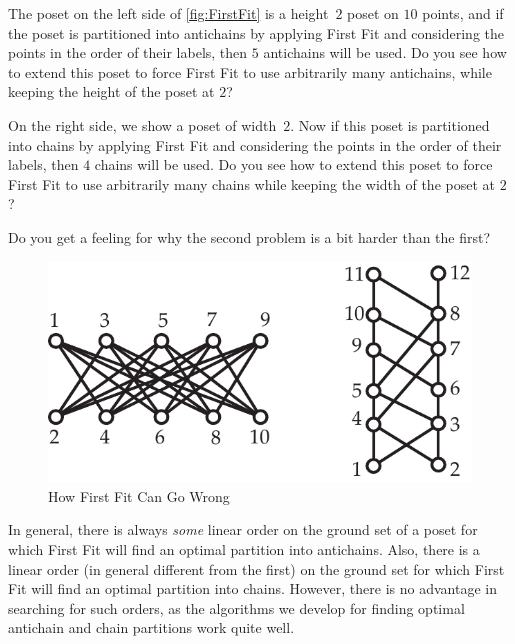 \begin{example}
  The poset on the left side of \autoref{fig:FirstFit} is a height~$2$
  poset on $10$ points, and if the poset is partitioned into
  antichains by applying First Fit and considering the points in the
  order of their labels, then $5$ antichains will be used.  Do you see
  how to extend this poset to force First Fit to use arbitrarily many
  antichains, while keeping the height of the poset at $2$?

  On the right side, we show a poset of width~$2$.  Now if this poset
  is partitioned into chains by applying First Fit and considering the
  points in the order of their labels, then $4$ chains will be used.
  Do you see how to extend this poset to force First Fit to use
  arbitrarily many chains while keeping the width of the poset at $2$?

  Do you get a feeling for why the second problem is a bit harder than
  the first?
\end{example}

\begin{figure}
\begin{center}
\includegraphics*[scale=.4]{posets-figs/FirstFit.pdf}
\caption{How First Fit Can Go Wrong}
\label{fig:FirstFit} 
\end{center}
\end{figure}

In general, there is always \textit{some} linear order on the ground set 
of a poset for which First Fit will find an optimal partition into antichains.  
Also, there is a linear order (in general different from the first) on the ground 
set for which First Fit will find an optimal partition into chains.
However, there is no advantage in searching for such orders, as the algorithms
we develop for finding optimal antichain and chain partitions work quite well.

